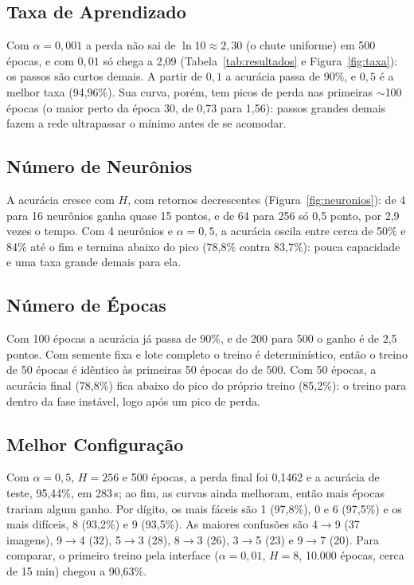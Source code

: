 \documentclass[letterpaper]{article} %
\begin{document}
\subsection{Taxa de Aprendizado}
Com $\alpha = 0{,}001$ a perda não sai de $\ln 10 \approx 2{,}30$ (o chute uniforme) em 500 épocas, e com $0{,}01$ só chega a 2,09 (Tabela~\ref{tab:resultados} e Figura~\ref{fig:taxa}): os passos são curtos demais. A partir de $0{,}1$ a acurácia passa de 90\%, e $0{,}5$ é a melhor taxa (94,96\%). Sua curva, porém, tem picos de perda nas primeiras $\sim$100 épocas (o maior perto da época 30, de 0,73 para 1,56): passos grandes demais fazem a rede ultrapassar o mínimo antes de se acomodar.

\subsection{Número de Neurônios}
A acurácia cresce com $H$, com retornos decrescentes (Figura~\ref{fig:neuronios}): de 4 para 16 neurônios ganha quase 15 pontos, e de 64 para 256 só 0,5 ponto, por 2,9 vezes o tempo. Com 4 neurônios e $\alpha = 0{,}5$, a acurácia oscila entre cerca de 50\% e 84\% até o fim e termina abaixo do pico (78,8\% contra 83,7\%): pouca capacidade e uma taxa grande demais para ela.

\subsection{Número de Épocas}
Com 100 épocas a acurácia já passa de 90\%, e de 200 para 500 o ganho é de 2,5 pontos. Com semente fixa e lote completo o treino é determinístico, então o treino de 50 épocas é idêntico às primeiras 50 épocas do de 500. Com 50 épocas, a acurácia final (78,8\%) fica abaixo do pico do próprio treino (85,2\%): o treino para dentro da fase instável, logo após um pico de perda.

\subsection{Melhor Configuração}
Com $\alpha = 0{,}5$, $H = 256$ e 500 épocas, a perda final foi 0,1462 e a acurácia de teste, 95,44\%, em 283\,s; ao fim, as curvas ainda melhoram, então mais épocas trariam algum ganho. Por dígito, os mais fáceis são 1 (97,8\%), 0 e 6 (97,5\%) e os mais difíceis, 8 (93,2\%) e 9 (93,5\%). As maiores confusões são 4$\to$9 (37 imagens), 9$\to$4 (32), 5$\to$3 (28), 8$\to$3 (26), 3$\to$5 (23) e 9$\to$7 (20). Para comparar, o primeiro treino pela interface ($\alpha = 0{,}01$, $H = 8$, 10.000 épocas, cerca de 15 min) chegou a 90,63\%.
\end{document}
